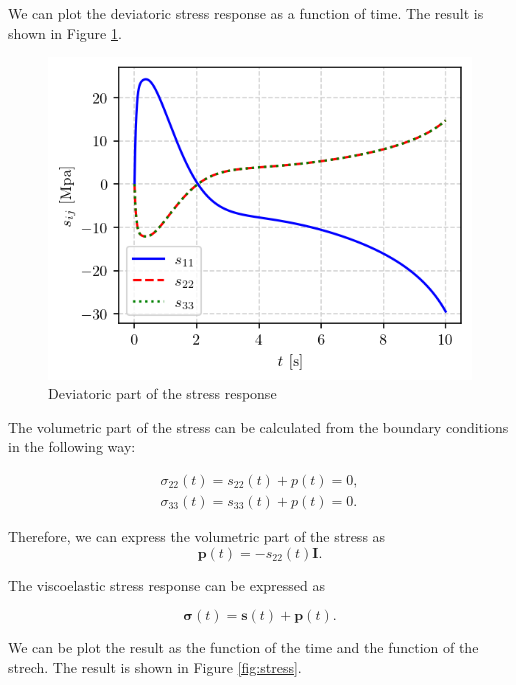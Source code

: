 \documentclass[12pt,a4paper]{article}
\begin{document}
We can plot the deviatoric stress response as a function of time. The result is shown in Figure \ref{fig:viscoelastic_stress}.
\begin{figure}[H]
    \centering
    \includegraphics[scale=1]{figures/deviatoric_response.png}
    \caption{Deviatoric part of the stress response}
    \label{fig:viscoelastic_stress}
\end{figure}

The volumetric part of the stress can be calculated from the boundary conditions in the following way:

\begin{equation}
    \begin{matrix}
        \sigma_{22}(t) = s_{22}(t) + p(t) = 0, \\
        \sigma_{33}(t) = s_{33}(t) + p(t) = 0.
    \end{matrix}
\end{equation}

Therefore, we can express the volumetric part of the stress as
\begin{equation}
    \boldsymbol{p}(t) = - s_{22}(t)\boldsymbol{I}.
\end{equation}

The viscoelastic stress response can be expressed as

\begin{equation}
    \boldsymbol{\sigma}(t) = \boldsymbol{s}(t) + \boldsymbol{p}(t).
\end{equation}

We can be plot the result as the function of the time and the function of the strech. The result is shown in Figure \ref{fig:stress}.
\end{document}
